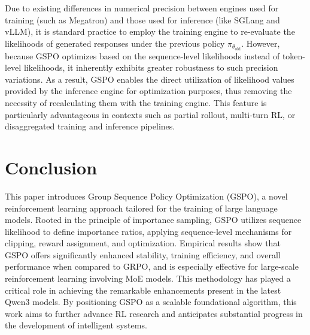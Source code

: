 Due to existing differences in numerical precision between engines used for training (such as Megatron) and those used for inference (like SGLang and vLLM), it is standard practice to employ the training engine to re-evaluate the likelihoods of generated responses under the previous policy $\pi_{\theta_\text{old}}$. However, because GSPO optimizes based on the sequence-level likelihoods instead of token-level likelihoods, it inherently exhibits greater robustness to such precision variations. As a result, GSPO enables the direct utilization of likelihood values provided by the inference engine for optimization purposes, thus removing the necessity of recalculating them with the training engine. This feature is particularly advantageous in contexts such as partial rollout, multi-turn RL, or disaggregated training and inference pipelines.

\section{Conclusion}

This paper introduces Group Sequence Policy Optimization (GSPO), a novel reinforcement learning approach tailored for the training of large language models. Rooted in the principle of importance sampling, GSPO utilizes sequence likelihood to define importance ratios, applying sequence-level mechanisms for clipping, reward assignment, and optimization. Empirical results show that GSPO offers significantly enhanced stability, training efficiency, and overall performance when compared to GRPO, and is especially effective for large-scale reinforcement learning involving MoE models. This methodology has played a critical role in achieving the remarkable enhancements present in the latest Qwen3 models. By positioning GSPO as a scalable foundational algorithm, this work aims to further advance RL research and anticipates substantial progress in the development of intelligent systems.

